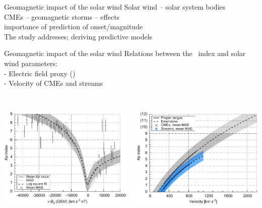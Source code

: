 \begin{frame}[c]{Geomagnetic impact of the solar wind}{}
	Solar wind -- solar system bodies\\
	CMEs -- geomagnetic storms -- effects\\
	importance of prediction of onset/magnitude\\
	The study addresses; deriving predictive models
\end{frame}
\begin{frame}[c]{Geomagnetic impact of the solar wind}{}
	\centering
	Relations between the \Kp~index and solar wind parameters:\\
		- Electric field proxy (\vBz{})\\
		- Velocity of CMEs and streams\\\ 
	
	\begin{columns}[c]
		
		\includegraphics[width=\textwidth]{../figures_of_mine/chapter2/Kp_2dhistogram_VBzgsm_sws_fit_e.pdf}
		
	
		\includegraphics[width=\textwidth]{../figures_of_mine/chapter2/Kp_2dhistogram_V_sws123_fit_f3.pdf}
		
	\end{columns}
\end{frame}



